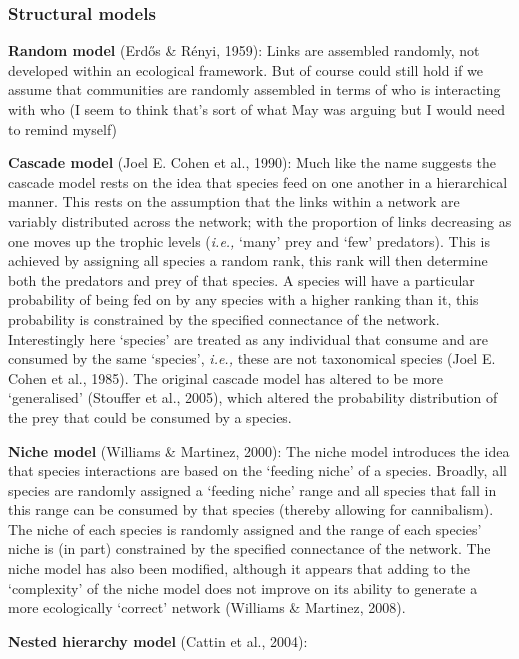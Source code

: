\documentclass[
]{agujournal2019}
\begin{document}
\subsubsection{Structural models}\label{structural-models}

\textbf{Random model} (Erdős \& Rényi, 1959): Links are assembled
randomly, not developed within an ecological framework. But of course
could still hold if we assume that communities are randomly assembled in
terms of who is interacting with who (I seem to think that's sort of
what May was arguing but I would need to remind myself)

\textbf{Cascade model} (Joel E. Cohen et al., 1990): Much like the name
suggests the cascade model rests on the idea that species feed on one
another in a hierarchical manner. This rests on the assumption that the
links within a network are variably distributed across the network; with
the proportion of links decreasing as one moves up the trophic levels
(\emph{i.e.,} `many' prey and `few' predators). This is achieved by
assigning all species a random rank, this rank will then determine both
the predators and prey of that species. A species will have a particular
probability of being fed on by any species with a higher ranking than
it, this probability is constrained by the specified connectance of the
network. Interestingly here `species' are treated as any individual that
consume and are consumed by the same `species', \emph{i.e.,} these are
not taxonomical species (Joel E. Cohen et al., 1985). The original
cascade model has altered to be more `generalised' (Stouffer et al.,
2005), which altered the probability distribution of the prey that could
be consumed by a species.

\textbf{Niche model} (Williams \& Martinez, 2000): The niche model
introduces the idea that species interactions are based on the `feeding
niche' of a species. Broadly, all species are randomly assigned a
`feeding niche' range and all species that fall in this range can be
consumed by that species (thereby allowing for cannibalism). The niche
of each species is randomly assigned and the range of each species'
niche is (in part) constrained by the specified connectance of the
network. The niche model has also been modified, although it appears
that adding to the `complexity' of the niche model does not improve on
its ability to generate a more ecologically `correct' network (Williams
\& Martinez, 2008).

\textbf{Nested hierarchy model} (Cattin et al., 2004):
\end{document}
